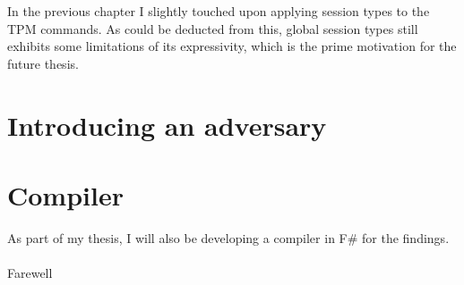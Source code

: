 \label{chap:Future Plan}
In the previous chapter I slightly touched upon applying session types to the TPM commands. As could be deducted from this, global session types still exhibits some limitations of its expressivity, which is the prime motivation for the future thesis. 
\section{Introducing an adversary}

\section{Compiler}
As part of my thesis, I will also be developing a compiler in F\# for the findings. \\ \\
Farewell
